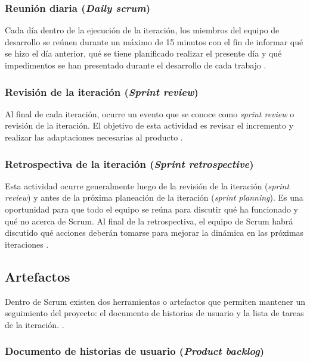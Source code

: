 \subsubsection{Reunión diaria (\textit{Daily scrum})}

Cada día dentro de la ejecución de la iteración, los miembros del equipo de desarrollo se reúnen durante un máximo de 15 minutos con el fin de informar qué se hizo el día anterior, qué se tiene planificado realizar el presente día y qué impedimentos se han presentado durante el desarrollo de cada trabajo \cite{SCRM12}.

\subsubsection{Revisión de la iteración (\textit{Sprint review})}

Al final de cada iteración, ocurre un evento que se conoce como \textit{sprint review} o revisión de la iteración. El objetivo de esta actividad es revisar el incremento y realizar las adaptaciones necesarias al producto \cite{SCRM12}.

\subsubsection{Retrospectiva de la iteración (\textit{Sprint retrospective})}

Esta actividad ocurre generalmente luego de la revisión de la iteración (\textit{sprint review}) y antes de la próxima planeación de la iteración (\textit{sprint planning}). Es una oportunidad para que todo el equipo se reúna para discutir qué ha funcionado y qué no acerca de Scrum. Al final de la retrospectiva, el equipo de Scrum habrá discutido qué acciones deberán tomarse para mejorar la dinámica en las próximas iteraciones \cite{SCRM2}. 

\subsection{Artefactos}

Dentro de Scrum existen dos herramientas o artefactos que permiten mantener un seguimiento del proyecto: el documento de historias de usuario y la lista de tareas de la iteración. \cite{SCRM2}.

\subsubsection{Documento de historias de usuario (\textit{Product backlog})}

